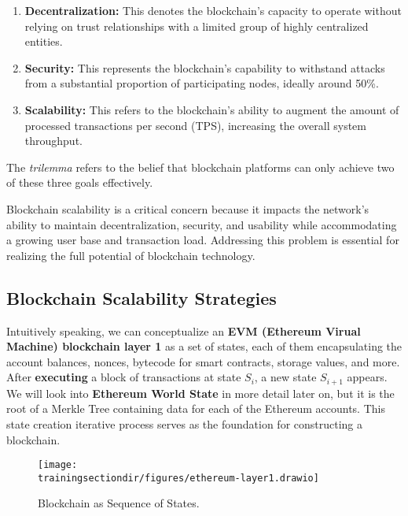 \begin{enumerate}

\item \textbf{Decentralization:} This denotes the blockchain's capacity to operate without relying on trust relationships with a limited group of highly centralized entities.

\item \textbf{Security:} This represents the blockchain's capability to withstand attacks from a substantial proportion of participating nodes, ideally around 50\%.

\item \textbf{Scalability:} This refers to the blockchain's ability to augment the amount of processed transactions per second (TPS), increasing the overall system throughput.

\end{enumerate}

The \textit{trilemma} refers to the belief that blockchain platforms can only achieve two of these three goals effectively.

Blockchain scalability is a critical concern because it impacts the network's ability to maintain decentralization, security, and usability while accommodating a growing user base and transaction load. Addressing this problem is essential for realizing the full potential of blockchain technology.

\subsection{Blockchain Scalability Strategies}

Intuitively speaking, we can conceptualize an \textbf{EVM (Ethereum Virual Machine) blockchain layer 1} as a set of states, each of them encapsulating the account balances, nonces, bytecode for smart contracts, storage values, and more. After \textbf{executing} a block of transactions at state $S_i$, a new state $S_{i+1}$ appears. We will look into \textbf{Ethereum World State} in more detail later on, but it is the root of a Merkle Tree containing data for each of the Ethereum accounts. This state creation iterative process serves as the foundation for constructing a blockchain.

\begin{figure}[H]
\centering
\texttt{[image: \\trainingsectiondir/figures/ethereum-layer1.drawio]}
\caption{Blockchain as Sequence of States.}
\end{figure}

